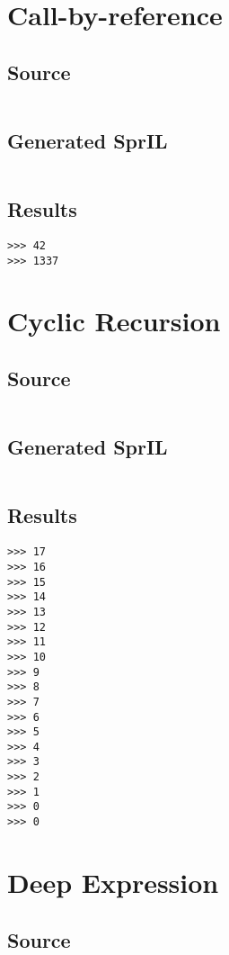\documentclass[twoside]{report}
\begin{document}
\section{Call-by-reference}
\subsection{Source}
\inputminted[tabsize=4,linenos,firstnumber=1]{text}{../test/call_by_reference.shl}
\subsection{Generated SprIL}
\inputminted[tabsize=4,linenos,firstnumber=0]{text}{../test/call_by_reference_gen.txt}
\subsection{Results}
\begin{verbatim}
>>> 42
>>> 1337
\end{verbatim}

\section{Cyclic Recursion}
\subsection{Source}
\inputminted[tabsize=4,linenos,firstnumber=1]{text}{../test/cyclic_recursion.shl}
\subsection{Generated SprIL}
\inputminted[tabsize=4,linenos,firstnumber=0]{text}{../test/cyclic_recursion_gen.txt}
\subsection{Results}
\begin{verbatim}
>>> 17
>>> 16
>>> 15
>>> 14
>>> 13
>>> 12
>>> 11
>>> 10
>>> 9
>>> 8
>>> 7
>>> 6
>>> 5
>>> 4
>>> 3
>>> 2
>>> 1
>>> 0
>>> 0
\end{verbatim}

\section{Deep Expression}
\subsection{Source}
\inputminted[tabsize=4,linenos,firstnumber=1]{text}{../test/deep_expression.shl}
\end{document}
